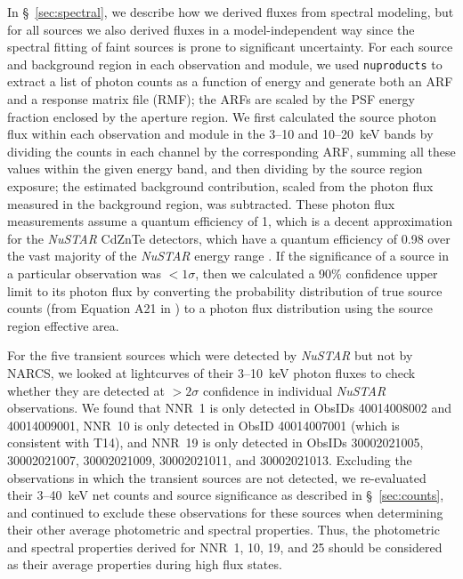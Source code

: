 \documentclass[iop,revtex4]{emulateapj}
\begin{document}
In \S~\ref{sec:spectral}, we describe how we derived fluxes from spectral modeling, but for all sources we also derived fluxes in a model-independent way since the spectral fitting of faint sources is prone to significant uncertainty.  For each source and background region in each observation and module, we used \texttt{nuproducts} to extract a list of photon counts as a function of energy and generate both an ARF and a response matrix file (RMF); the ARFs are scaled by the PSF energy fraction enclosed by the aperture region.  We first calculated the source photon flux within each observation and module in the 3--10 and 10--20~keV bands by dividing the counts in each channel by the corresponding ARF, summing all these values within the given energy band, and then dividing by the source region exposure; the estimated background contribution, scaled from the photon flux measured in the background region, was subtracted.  These photon flux measurements assume a quantum efficiency of 1, which is a decent approximation for the \textit{NuSTAR} CdZnTe detectors, which have a quantum efficiency of 0.98 over the vast majority of the \textit{NuSTAR} energy range \citep{bhalerao12}.  If the significance of a source in a particular observation was $<1\sigma$, then we calculated a 90\% confidence upper limit to its photon flux by converting the probability distribution of true source counts (from Equation A21 in \citealt{weiss07}) to a photon flux distribution using the source region effective area.  \par
For the five transient sources which were detected by \textit{NuSTAR} but not by NARCS, we looked at lightcurves of their 3--10~keV photon fluxes to check whether they are detected at $>2\sigma$ confidence in individual \textit{NuSTAR} observations.  We found that NNR~1 is only detected in ObsIDs 40014008002 and 40014009001, NNR~10 is only detected in ObsID 40014007001 (which is consistent with T14), and NNR~19 is only detected in ObsIDs 30002021005, 30002021007, 30002021009, 30002021011, and 30002021013.  Excluding the observations in which the transient sources are not detected, we re-evaluated their 3--40~keV net counts and source significance as described in \S~\ref{sec:counts}, and continued to exclude these observations for these sources when determining their other average photometric and spectral properties.  Thus, the photometric and spectral properties derived for NNR~1, 10, 19, and 25 should be considered as their average properties during high flux states.  \par
\end{document}
